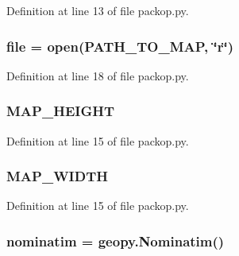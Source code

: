 Definition at line 13 of file packop.\+py.

\subsubsection[{\texorpdfstring{file}{file}}]{\setlength{\rightskip}{0pt plus 5cm}file = open({\bf P\+A\+T\+H\+\_\+\+T\+O\+\_\+\+M\+AP}, \char`\"{}r\char`\"{})}\hypertarget{namespacesrc_1_1packop_a40a5d58ffa6e88aa578d6683ac413105}{}\label{namespacesrc_1_1packop_a40a5d58ffa6e88aa578d6683ac413105}


Definition at line 18 of file packop.\+py.

\subsubsection[{\texorpdfstring{M\+A\+P\+\_\+\+H\+E\+I\+G\+HT}{MAP_HEIGHT}}]{\setlength{\rightskip}{0pt plus 5cm}M\+A\+P\+\_\+\+H\+E\+I\+G\+HT}\hypertarget{namespacesrc_1_1packop_a66c886303dc7450a2538d2d0799d98e3}{}\label{namespacesrc_1_1packop_a66c886303dc7450a2538d2d0799d98e3}


Definition at line 15 of file packop.\+py.

\subsubsection[{\texorpdfstring{M\+A\+P\+\_\+\+W\+I\+D\+TH}{MAP_WIDTH}}]{\setlength{\rightskip}{0pt plus 5cm}M\+A\+P\+\_\+\+W\+I\+D\+TH}\hypertarget{namespacesrc_1_1packop_ad9405b9e27addc61f310c18d8f5f85e1}{}\label{namespacesrc_1_1packop_ad9405b9e27addc61f310c18d8f5f85e1}


Definition at line 15 of file packop.\+py.

\subsubsection[{\texorpdfstring{nominatim}{nominatim}}]{\setlength{\rightskip}{0pt plus 5cm}nominatim = geopy.\+Nominatim()}\hypertarget{namespacesrc_1_1packop_adb3f5c1dc784a036515907f2303d1fdc}{}\label{namespacesrc_1_1packop_adb3f5c1dc784a036515907f2303d1fdc}


